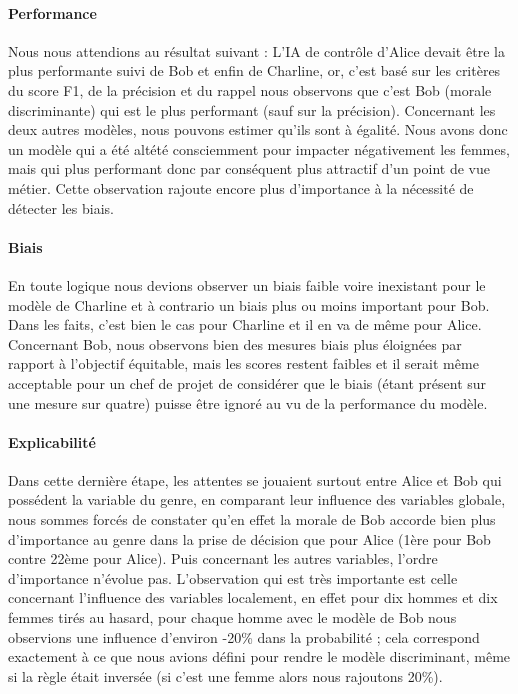 \documentclass[10pt, french, a4paper]{report}
\begin{document}
\paragraph{Performance} Nous nous attendions au résultat suivant : L'IA de contrôle d'Alice devait être la plus performante suivi de Bob et enfin de Charline, or, c'est basé sur les critères du score F1, de la précision et du rappel nous observons que c'est Bob (morale discriminante) qui est le plus performant (sauf sur la précision). Concernant les deux autres modèles, nous pouvons estimer qu'ils sont à égalité. Nous avons donc un modèle qui a été altété consciemment pour impacter négativement les femmes, mais qui plus performant donc par conséquent plus attractif d'un point de vue métier. Cette observation rajoute encore plus d'importance à la nécessité de détecter les biais.

\paragraph{Biais} En toute logique nous devions observer un biais faible voire inexistant pour le modèle de Charline et à contrario un biais plus ou moins important pour Bob. Dans les faits, c'est bien le cas pour Charline et il en va de même pour Alice. Concernant Bob, nous observons bien des mesures biais plus éloignées par rapport à l'objectif équitable, mais les scores restent faibles et il serait même acceptable pour un chef de projet de considérer que le biais (étant présent sur une mesure sur quatre) puisse être ignoré au vu de la performance du modèle.

\paragraph{Explicabilité} Dans cette dernière étape, les attentes se jouaient surtout entre Alice et Bob qui possédent la variable du genre, en comparant leur influence des variables globale, nous sommes forcés de constater qu'en effet la morale de Bob accorde bien plus d'importance au genre dans la prise de décision que pour Alice (1ère pour Bob contre 22ème pour Alice). Puis concernant les autres variables, l'ordre d'importance n'évolue pas. L'observation qui est très importante est celle concernant l'influence des variables localement, en effet pour dix hommes et dix femmes tirés au hasard, pour chaque homme avec le modèle de Bob nous observions une influence d'environ -20\% dans la probabilité ; cela correspond exactement à ce que nous avions défini pour rendre le modèle discriminant, même si la règle était inversée (si c'est une femme alors nous rajoutons 20\%).
\end{document}
